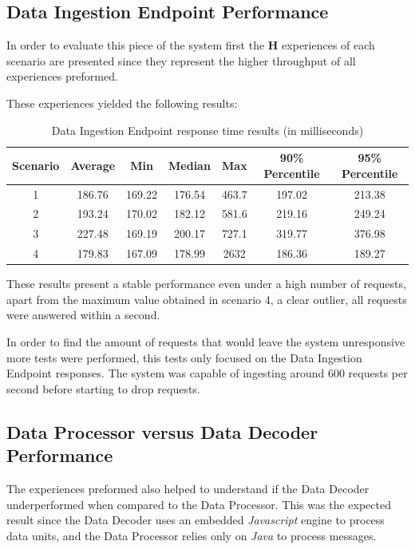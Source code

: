 \subsection{Data Ingestion Endpoint Performance}
\label{subsec:evaluation:overview:endpoint}

In order to evaluate this piece of the system first the \textbf{H} experiences of each scenario are presented since they represent the higher throughput of all experiences preformed.

These experiences yielded the following results:

\begin{table}[H]
    \caption{Data Ingestion Endpoint response time results (in milliseconds)}
    \label{tab:evaluation:overview:endpoint:results}
    \centering
    \begin{tabular}{@{}ccccccc@{}}
    \toprule
    \textbf{Scenario} & \textbf{Average} & \textbf{Min} & \textbf{Median} & \textbf{Max} & \textbf{90\% Percentile} & \textbf{95\% Percentile} \\ \midrule
    1 & 186.76 & 169.22 & 176.54 & 463.7 & 197.02 & 213.38 \\ \midrule
    2 & 193.24 & 170.02 & 182.12 & 581.6 & 219.16 & 249.24 \\ \midrule
    3 & 227.48 & 169.19 & 200.17 & 727.1 & 319.77 & 376.98 \\ \midrule
    4 & 179.83 & 167.09 & 178.99 & 2632 & 186.36 & 189.27 \\ \bottomrule
    \end{tabular}
\end{table}

These results present a stable performance even under a high number of requests, apart from the maximum value obtained in scenario 4, a clear outlier, all requests were answered within a second.

In order to find the amount of requests that would leave the system unresponsive more tests were performed, this tests only focused on the Data Ingestion Endpoint responses. The system was capable of ingesting around 600 requests per second before starting to drop requests.

\subsection{Data Processor versus Data Decoder Performance}
\label{subsec:evaluation:overview:decoproc}

The experiences preformed also helped to understand if the Data Decoder  underperformed when compared to the Data Processor. This was the expected result since the Data Decoder uses an embedded \textit{Javascript} engine to process data units, and the Data Processor relies only on \textit{Java} to process messages.

